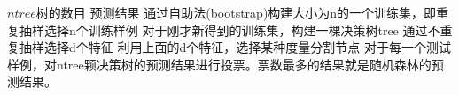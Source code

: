 \documentclass[11pt]{ctexart}
\begin{document}
  
    \begin{algorithm}  
        \begin{algorithmic}[1] %
            \Require    $ntree$树的数目
            \Ensure 预测结果
                \State 通过自助法(bootstrap)构建大小为n的一个训练集，即重复抽样选择n个训练样例
                \State 对于刚才新得到的训练集，构建一棵决策树tree
                        \State 通过不重复抽样选择d个特征
                        \State 利用上面的d个特征，选择某种度量分割节点
                    \EndFor
                \EndFor
                \State 对于每一个测试样例，对ntree颗决策树的预测结果进行投票。票数最多的结果就是随机森林的预测结果。
            \EndFunction  
        \end{algorithmic}  
    \end{algorithm}  
\end{document}
